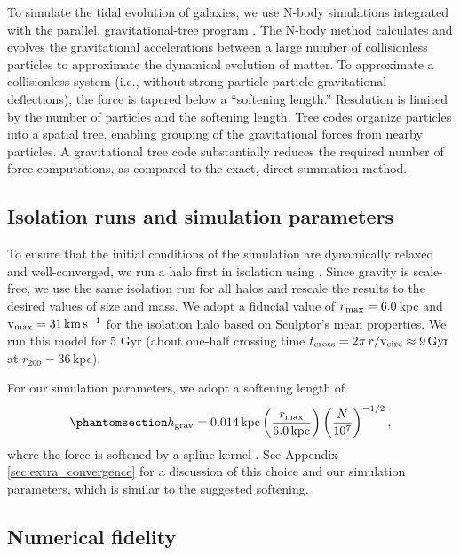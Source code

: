 To simulate the tidal evolution of galaxies, we use N-body simulations
integrated with the parallel, gravitational-tree program \gadget{}
\citep{gadget4}. The N-body method calculates and evolves the
gravitational accelerations between a large number of collisionless
particles to approximate the dynamical evolution of matter. To
approximate a collisionless system (i.e., without strong
particle-particle gravitational deflections), the force is tapered below
a ``softening length.'' Resolution is limited by the number of particles
and the softening length. Tree codes organize particles into a spatial
tree, enabling grouping of the gravitational forces from nearby
particles. A gravitational tree code substantially reduces the required
number of force computations, as compared to the exact, direct-summation
method.

\subsection{Isolation runs and simulation
parameters}\label{isolation-runs-and-simulation-parameters}

To ensure that the initial conditions of the simulation are dynamically
relaxed and well-converged, we run a halo first in isolation using
\gadget{}. Since gravity is scale-free, we use the same isolation run
for all halos and rescale the results to the desired values of size and
mass. We adopt a fiducial value of \(r_{\rm max} = 6.0\,\)kpc and
\({\rm v}_{\rm max} = 31\,{\rm km\,s^{-1}}\) for the isolation halo based on Sculptor's mean
properties. We run this model for 5 Gyr (about one-half crossing time
\(t_{\rm cross} = 2\pi\,r /{\rm v}_{\rm circ}  \approx 9\,{\rm Gyr}\) at
\(r_{200}=36\,\)kpc).

For our simulation parameters, we adopt a softening length of
\begin{equation}\protect\phantomsection\label{eq:softening_length}{
h_{\rm grav} = 0.014\,{\rm kpc}\left(\frac{r_{\rm max}}{6.0\,{\rm kpc}}\right)\left(\frac{N}{10^7}\right)^{-1/2},
}\end{equation} where the force is softened by a spline kernel
\citetext{\citealp[eqs. 70--71
in][]{springel+yoshida+white2001}; \citealp[but with the spline
characteristic radius \(2.8h_{\rm grav}\), see][]{gadget4}}. See
Appendix \ref{sec:extra_convergence} for a discussion of this choice and
our simulation parameters, which is similar to the \citet{power+2003}
suggested softening.

\subsection{Numerical fidelity}\label{numerical-fidelity}

